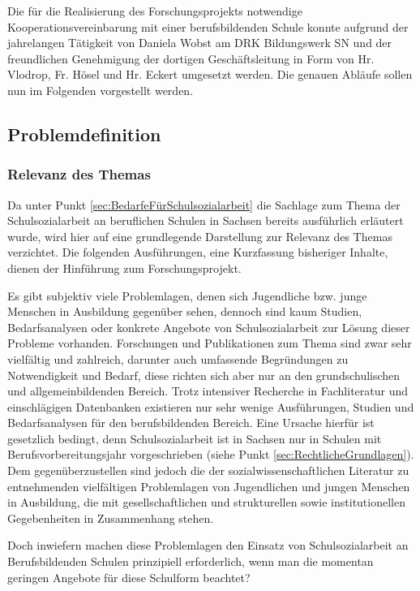 Die für die Realisierung des Forschungsprojekts notwendige Kooperationsvereinbarung mit einer berufsbildenden Schule konnte aufgrund der jahrelangen Tätigkeit von Daniela Wobst am DRK Bildungswerk SN und der freundlichen Genehmigung der dortigen Geschäftsleitung in Form von Hr. Vlodrop, Fr. Hösel und Hr. Eckert umgesetzt werden. Die genauen Abläufe sollen nun im Folgenden vorgestellt werden.

\subsection{Problemdefinition}
\label{sec:Problemdefinition}

\subsubsection{Relevanz des Themas}
\label{sec:RelevanzDesThemas}

Da unter Punkt \ref{sec:BedarfeFürSchulsozialarbeit} die Sachlage zum Thema der Schulsozialarbeit an beruflichen Schulen in Sachsen bereits ausführlich erläutert wurde, wird hier auf eine grundlegende Darstellung zur Relevanz des Themas verzichtet. Die folgenden Ausführungen, eine Kurzfassung bisheriger Inhalte, dienen der Hinführung zum Forschungsprojekt.

Es gibt subjektiv viele Problemlagen, denen sich Jugendliche bzw. junge Menschen in Ausbildung gegenüber sehen, dennoch sind kaum Studien, Bedarfsanalysen oder konkrete Angebote von Schulsozialarbeit zur Lösung dieser Probleme vorhanden. Forschungen und Publikationen zum Thema sind zwar sehr vielfältig und zahlreich, darunter auch umfassende Begründungen zu Notwendigkeit und Bedarf, diese richten sich aber nur an den grundschulischen und allgemeinbildenden Bereich. Trotz intensiver Recherche in Fachliteratur und einschlägigen Datenbanken existieren nur sehr wenige Ausführungen, Studien und Bedarfsanalysen für den berufsbildenden Bereich. Eine Ursache hierfür ist gesetzlich bedingt, denn Schulsozialarbeit ist in Sachsen nur in Schulen mit Berufsvorbereitungsjahr vorgeschrieben (siehe Punkt \ref{sec:RechtlicheGrundlagen}). Dem gegenüberzustellen sind jedoch die der sozialwissenschaftlichen Literatur zu entnehmenden vielfältigen Problemlagen von Jugendlichen und jungen Menschen in Ausbildung, die mit gesellschaftlichen und strukturellen sowie institutionellen Gegebenheiten in Zusammenhang stehen. 

Doch inwiefern machen diese Problemlagen den Einsatz von Schulsozialarbeit an Berufsbildenden Schulen prinzipiell erforderlich, wenn man die momentan geringen Angebote für diese Schulform beachtet? 

